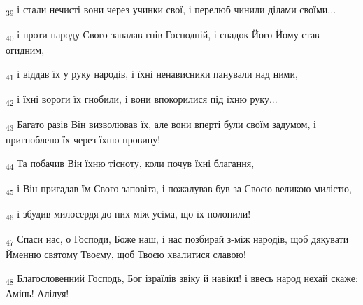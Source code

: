 \begin{tcolorbox}
\textsubscript{39} і стали нечисті вони через учинки свої, і перелюб чинили ділами своїми...
\end{tcolorbox}
\begin{tcolorbox}
\textsubscript{40} і проти народу Свого запалав гнів Господній, і спадок Його Йому став огидним,
\end{tcolorbox}
\begin{tcolorbox}
\textsubscript{41} і віддав їх у руку народів, і їхні ненависники панували над ними,
\end{tcolorbox}
\begin{tcolorbox}
\textsubscript{42} і їхні вороги їх гнобили, і вони впокорилися під їхню руку...
\end{tcolorbox}
\begin{tcolorbox}
\textsubscript{43} Багато разів Він визволював їх, але вони вперті були своїм задумом, і пригноблено їх через їхню провину!
\end{tcolorbox}
\begin{tcolorbox}
\textsubscript{44} Та побачив Він їхню тісноту, коли почув їхні благання,
\end{tcolorbox}
\begin{tcolorbox}
\textsubscript{45} і Він пригадав їм Свого заповіта, і пожалував був за Своєю великою милістю,
\end{tcolorbox}
\begin{tcolorbox}
\textsubscript{46} і збудив милосердя до них між усіма, що їх полонили!
\end{tcolorbox}
\begin{tcolorbox}
\textsubscript{47} Спаси нас, о Господи, Боже наш, і нас позбирай з-між народів, щоб дякувати Йменню святому Твоєму, щоб Твоєю хвалитися славою!
\end{tcolorbox}
\begin{tcolorbox}
\textsubscript{48} Благословенний Господь, Бог ізраїлів звіку й навіки! і ввесь народ нехай скаже: Амінь! Алілуя!
\end{tcolorbox}
